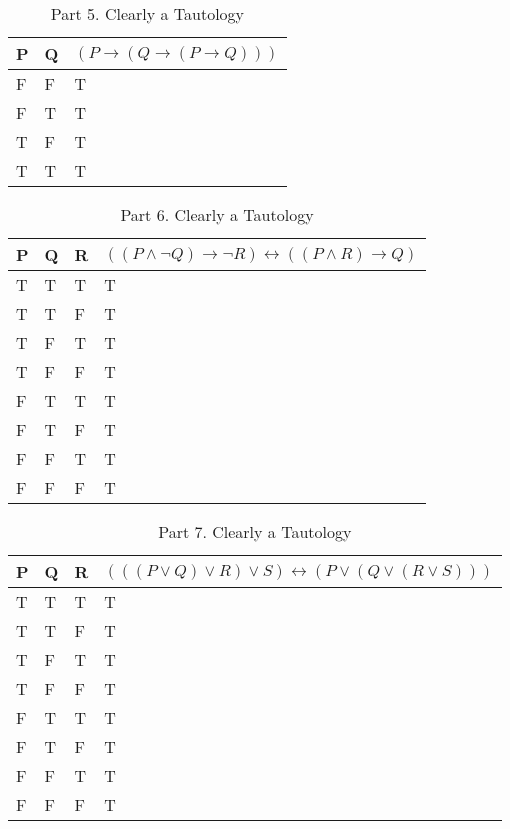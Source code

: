 \documentclass[10.5pt]{article}
\newenvironment{solution}[2][Solution]{ \begin{trivlist}
\item[\hskip \labelsep {\bfseries #1}]}{\end{trivlist}}
\begin{document}
\begin{solution}{2}
\begin{table}[!h]
\centering
\caption{Part 5. Clearly a Tautology}
\label{my-label}
\begin{tabular}{|l|l|l|}
\hline
P & Q & $(P \rightarrow (Q \rightarrow (P \rightarrow Q)))$ \\ \hline
F & F & T \\ \hline
F & T & T \\ \hline
T & F & T \\ \hline
T & T & T \\ \hline
\end{tabular}
\end{table}

\begin{table}[!h]
\centering
\caption{Part 6. Clearly a Tautology}
\label{my-label}
\begin{tabular}{|l|l|l|l|}
\hline
P & Q & R & $((P \wedge \lnot Q) \rightarrow \lnot R) \leftrightarrow ((P \wedge R) \rightarrow Q)$ \\ \hline
T & T & T & T \\ \hline
T & T & F & T \\ \hline
T & F & T & T \\ \hline
T & F & F & T \\ \hline
F & T & T & T \\ \hline
F & T & F & T \\ \hline
F & F & T & T \\ \hline
F & F & F & T \\ \hline
\end{tabular}
\end{table}

\begin{table}[!h]
\centering
\caption{Part 7. Clearly a Tautology}
\label{my-label}
\begin{tabular}{|l|l|l|l|}
\hline
P & Q & R & $(((P \vee Q) \vee R) \vee S) \leftrightarrow (P \vee (Q \vee (R \vee S)))$ \\ \hline
T & T & T & T \\ \hline
T & T & F & T \\ \hline
T & F & T & T \\ \hline
T & F & F & T \\ \hline
F & T & T & T \\ \hline
F & T & F & T \\ \hline
F & F & T & T \\ \hline
F & F & F & T \\ \hline
\end{tabular}
\end{table}


\end{solution}
\end{document}
